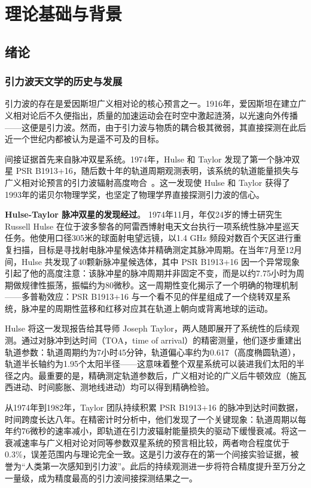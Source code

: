 \pagestyle{mystyle}

\part{理论基础与背景}

\renewcommand{\parttitle}{理论基础与背景}

\chapter{绪论}

\section{引力波天文学的历史与发展}

引力波的存在是爱因斯坦广义相对论的核心预言之一。1916年，爱因斯坦在建立广义相对论后不久便指出，质量的加速运动会在时空中激起涟漪，以光速向外传播——这便是引力波。然而，由于引力波与物质的耦合极其微弱，其直接探测在此后近一个世纪内都被认为是遥不可及的目标。

间接证据首先来自脉冲双星系统。1974年，Hulse 和 Taylor 发现了第一个脉冲双星 PSR B1913+16，随后数十年的轨道周期观测表明，该系统的轨道能量损失与广义相对论预言的引力波辐射高度吻合~\cite{HulseTaylor1975}。这一发现使 Hulse 和 Taylor 获得了1993年的诺贝尔物理学奖，也坚定了物理学界直接探测引力波的信心。

\textbf{Hulse-Taylor 脉冲双星的发现经过}。
1974年11月，年仅24岁的博士研究生 Russell Hulse 在位于波多黎各的阿雷西博射电天文台执行一项系统性脉冲星巡天任务。他使用口径305米的球面射电望远镜，以1.4 GHz 频段对数百个天区进行重复扫描，目标是寻找射电脉冲星候选体并精确测定其脉冲周期。在当年7月至12月间，Hulse 共发现了40颗新脉冲星候选体，其中 PSR B1913+16 因一个异常现象引起了他的高度注意：该脉冲星的脉冲周期并非固定不变，而是以约7.75小时为周期做规律性振荡，振幅约为80微秒。这一周期性变化揭示了一个明确的物理机制——多普勒效应：PSR B1913+16 与一个看不见的伴星组成了一个绕转双星系统，脉冲星的周期性蓝移和红移对应其在轨道上朝向或背离地球的运动。

Hulse 将这一发现报告给其导师 Joseph Taylor，两人随即展开了系统性的后续观测。通过对脉冲到达时间（TOA，time of arrival）的精密测量，他们逐步重建出轨道参数：轨道周期约为7小时45分钟，轨道偏心率约为0.617（高度椭圆轨道），轨道半长轴约为1.95个太阳半径——这意味着整个双星系统可以装进我们太阳的半径之内。最重要的是，精确测定轨道参数后，广义相对论的广义后牛顿效应（施瓦西进动、时间膨胀、测地线进动）均可以得到精确检验。

从1974年到1982年，Taylor 团队持续积累 PSR B1913+16 的脉冲到达时间数据，时间跨度长达八年。在精密计时分析中，他们发现了一个关键现象：轨道周期以每年约76微秒的速率减小，即轨道在引力波辐射能量损失的驱动下缓慢衰减。将这一衰减速率与广义相对论对同等参数双星系统的预言相比较，两者吻合程度优于0.3\%，误差范围内与理论完全一致。这是引力波存在的第一个间接实验证据，被誉为“人类第一次感知到引力波”。此后的持续观测进一步将符合精度提升至万分之一量级，成为精度最高的引力波间接探测结果之一。

